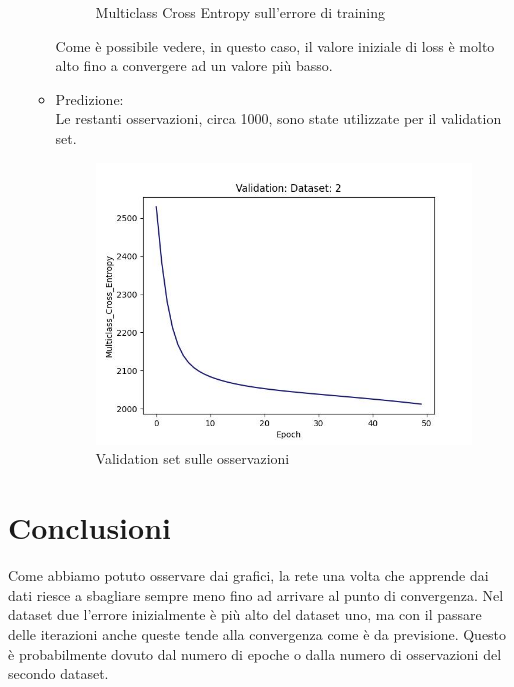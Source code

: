 \documentclass{article}
\begin{document}
\begin{itemize}
\begin{itemize}
\begin{figure}[H]
                    \caption{Multiclass Cross Entropy sull'errore di training}
                    \label{fig:figure4}
                \end{figure}
                Come è possibile vedere, in questo caso, il valore iniziale di loss è molto alto fino a convergere ad un valore più basso.
                \item Predizione: \\
                Le restanti osservazioni, circa 1000, sono state utilizzate per il validation set.
                \begin{figure}[H]
                    \centering
                    \includegraphics[scale=0.50]{validation2}
                    \caption{Validation set sulle osservazioni}
                    \label{fig:figure5}
                \end{figure}

            \end{itemize}
        \end{itemize}
    \newpage
    \section{Conclusioni}\label{sec:conclusioni}
        Come abbiamo potuto osservare dai grafici, la rete una volta che apprende dai dati riesce a sbagliare sempre meno fino ad arrivare al punto di convergenza.
        Nel dataset due l'errore inizialmente è più alto del dataset uno, ma con il passare delle iterazioni anche queste tende alla convergenza come è da previsione.
        Questo è probabilmente dovuto dal numero di epoche o dalla numero di osservazioni del secondo dataset.
\end{document}
